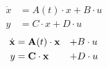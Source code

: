 \begin{align}\label{eq:1}
    \dot{x} &= A(t) \cdot x + B \cdot u\\
          y &= C \cdot x + D \cdot u
\end{align}
%
\def\vx{\vk{x}}
\begin{alignat*}{2} %
    \dot{\vx} &= \vk{A}(t) \cdot \vx  &+& B \cdot u\\
           y &=  \vk{C}    \cdot \vx  &+& D \cdot u
\end{alignat*}

